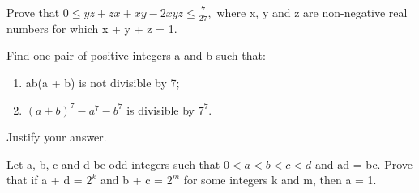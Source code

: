\item Prove that $0 \leq yz + zx + xy - 2xyz \leq \frac{7}{27},$ where x, y and z are non-negative real numbers for which x + y + z = 1.

\item Find one pair of positive integers a and b such that:
\begin{enumerate}
\item ab(a + b) is not divisible by 7;
\item $(a + b)^{7} - a^{7} - b^{7}$ is divisible by $7^{7}$.
\end{enumerate}
Justify your answer.

\item Let a, b, c and d be odd integers such that $0 < a < b < c < d$ and ad = bc. 
Prove that if a + d = $2^{k}$ and b + c = $2^{m}$ for some integers k and m, then a = 1.

















